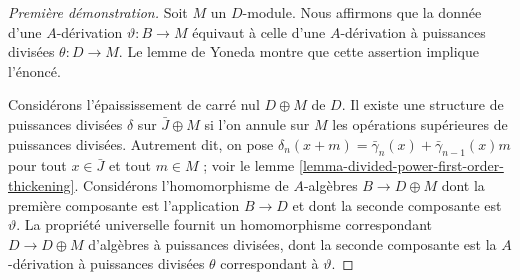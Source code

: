 \begin{proof}[Première démonstration]
Soit $M$ un $D$-module. Nous affirmons que la donnée d'une $A$-dérivation
$\vartheta : B \to M$ équivaut à celle d'une
$A$-dérivation à puissances divisées $\theta : D \to M$. Le lemme de Yoneda
montre que cette assertion implique l'énoncé.

\medskip\noindent
Considérons l'épaississement de carré nul $D \oplus M$ de $D$.
Il existe une structure de puissances divisées $\delta$ sur $\bar J \oplus M$
si l'on annule sur $M$ les opérations supérieures de puissances divisées.
Autrement dit, on pose
$\delta_n(x + m) = \bar\gamma_n(x) + \bar\gamma_{n - 1}(x)m$ pour
tout $x \in \bar J$ et tout $m \in M$ ; voir le
lemme \ref{lemma-divided-power-first-order-thickening}.
Considérons l'homomorphisme de $A$-algèbres $B \to D \oplus M$ dont la première
composante est l'application $B \to D$ et dont la seconde composante
est $\vartheta$. La propriété universelle fournit un
homomorphisme correspondant $D \to D \oplus M$ d'algèbres à puissances divisées,
dont la seconde composante est la
$A$-dérivation à puissances divisées $\theta$ correspondant à $\vartheta$.
\end{proof}

